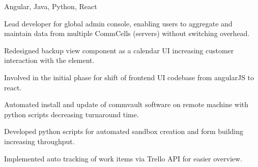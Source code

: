 \documentclass[]{font}
\begin{document}
\begin{minipage}[t]{0.66\textwidth}
Angular, Java, Python, React
\vspace{\topsep}
\begin{tightemize}
\item Lead developer for global admin console, enabling users to aggregate and maintain data from multiple CommCells (servers) without switching overhead. 
\item Redesigned backup view component as a calendar UI increasing customer interaction with the element.
\item Involved in the initial phase for shift of frontend UI codebase from angularJS to react.
\item Automated install and update of commvault software on remote machine with python scripts decreasing turnaround time.
\item Developed python scripts for automated sandbox creation and form building increasing throughput. 
\item Implemented auto tracking of work items via Trello API for easier overview.
\end{tightemize}    
\sectionsep



\end{minipage}
\end{document}
